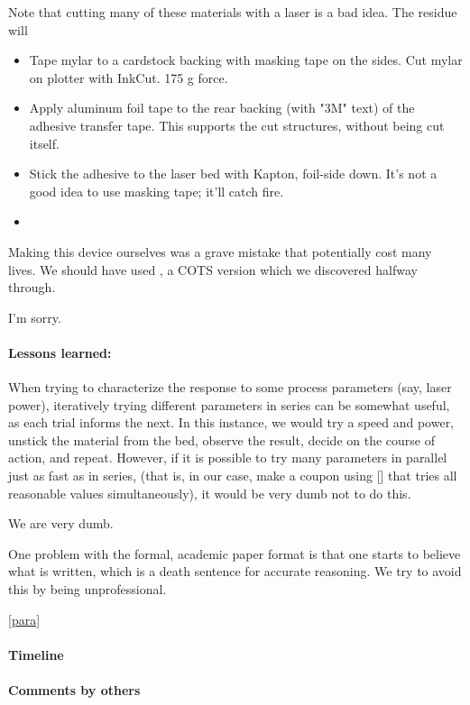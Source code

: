 \documentclass[paper.tex]{subfiles}
\begin{document}
Note that cutting many of these materials with a laser is a bad idea. The residue will 

\begin{itemize}
	\item Tape mylar to a cardstock backing with masking tape on the sides. Cut mylar on plotter with InkCut. 175 g force. 
	\item Apply aluminum foil tape to the rear backing (with "3M" text) of the adhesive transfer tape. This supports the cut structures, without being cut itself.
	\item Stick the adhesive to the laser bed with Kapton, foil-side down. It's not a good idea to use masking tape; it'll catch fire.
	\item 
\end{itemize}





Making this device ourselves was a grave mistake that potentially cost many lives. We should have used \cite{Straight}, a COTS version which we discovered halfway through. 

I'm sorry.

\paragraph{Lessons learned:}

When trying to characterize the response to some process parameters (say, laser power), iteratively trying different parameters in series can be somewhat useful, as each trial informs the next. In this instance, we would try a speed and power, unstick the material from the bed, observe the result, decide on the course of action, and repeat. However, if it is possible to try many parameters in parallel just as fast as in series, (that is, in our case, make a coupon using [] that tries all reasonable values simultaneously), it would be very dumb not to do this.

We are very dumb.

\printbibliography[title={General fluidics resources}, keyword={microfluidics}]

\printbibliography[title={Centrifugal}, keyword={centrifugal}]



One problem with the formal, academic paper format is that one starts to believe what is written, which is a death sentence for accurate reasoning. We try to avoid this by being unprofessional.

\label{para}
\ref{para}

\paragraph{Timeline}

\paragraph{Comments by others}


\end{document}
